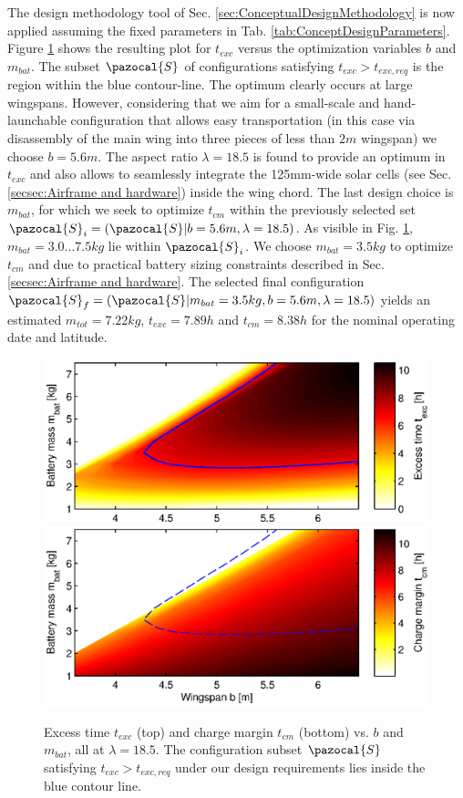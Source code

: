 The design methodology tool of Sec. \ref{sec:ConceptualDesignMethodology} is now applied assuming the fixed parameters in Tab. \ref{tab:ConceptDesignParameters}. Figure \ref{fig:ExcessTimeChargeMargin} shows the resulting plot for $t_{exc}$ versus the optimization variables $b$ and $m_{bat}$. The subset $\pazocal{S}$ of configurations satisfying $t_{exc}>t_{exc,req}$ is the region within the blue contour-line. The optimum clearly occurs at large wingspans. However, considering that we aim for a small-scale and hand-launchable configuration that allows easy transportation (in this case via disassembly of the main wing into three pieces of less than $2m$ wingspan) we choose $b=5.6m$.  The aspect ratio $\lambda=18.5$ is found to provide an optimum in $t_{exc}$ and also allows to seamlessly integrate the 125mm-wide solar cells (see Sec. \ref{secsec:Airframe and hardware}) inside the wing chord. The last design choice is $m_{bat}$, for which we seek to optimize $t_{cm}$ within the previously selected set $\pazocal{S}_i=(\pazocal{S}|b=5.6m, \lambda=18.5)$. As visible in Fig. \ref{fig:ExcessTimeChargeMargin}, $m_{bat}=3.0...7.5kg$ lie within $\pazocal{S}_i$. We choose $m_{bat}=3.5kg$ to optimize $t_{cm}$ and due to practical battery sizing constraints described in Sec. \ref{secsec:Airframe and hardware}. The selected final configuration $\pazocal{S}_f=(\pazocal{S}|m_{bat}=3.5kg, b=5.6m, \lambda=18.5)$ yields an estimated $m_{tot}=7.22kg$, $t_{exc}=7.89h$ and $t_{cm}=8.38h$ for the nominal operating date and latitude.
\begin{figure}[tb]
    \centering
    \includegraphics[width=\linewidth]{images/3_excesstime}
    \includegraphics[width=\linewidth]{images/4_chargemargin}
    \caption{Excess time $t_{exc}$ (top) and charge margin $t_{cm}$ (bottom) vs. $b$ and $m_{bat}$, all at $\lambda=18.5$. The configuration subset $\pazocal{S}$ satisfying $t_{exc}>t_{exc,req}$ under our design requirements lies inside the blue contour line.}
    \label{fig:ExcessTimeChargeMargin}
\end{figure}
